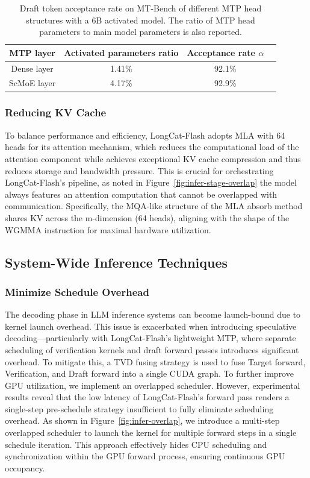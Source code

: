 \documentclass{article}
\newcommand{\longcat}{LongCat-Flash\xspace}
\begin{document}
\begin{table}[ht]
\caption{Draft token acceptance rate on MT-Bench of different MTP head structures with a 6B activated model. The ratio of MTP head parameters to main model parameters is also reported.}
\centering
\begin{tabular}{cccc}
\toprule
MTP layer & Activated parameters ratio &  Acceptance rate $\alpha$ \\ 
\midrule
Dense layer  & 1.41\%  & 92.1\%   \\ 
ScMoE layer  &  4.17\%  &  92.9\%  \\ 
\bottomrule
\end{tabular}
\label{table:mtp_speedup}
\end{table}

\subsubsection{Reducing KV Cache}

To balance performance and efficiency, \longcat adopts MLA with 64 heads for its attention mechanism, which reduces the computational load of the attention component while achieves exceptional KV cache compression and thus reduces storage and bandwidth pressure. This is crucial for orchestrating \longcat's pipeline, as noted in Figure~\ref{fig:infer-stage-overlap} the model always features an attention computation that cannot be overlapped with communication. Specifically, the MQA-like structure of the MLA absorb method shares KV across the m-dimension (64 heads), aligning with the shape of the WGMMA instruction for maximal hardware utilization. 

\subsection{System-Wide Inference Techniques}

\subsubsection{Minimize Schedule Overhead}

The decoding phase in LLM inference systems can become launch-bound due to kernel launch overhead. This issue is exacerbated when introducing speculative decoding---particularly with \longcat's lightweight MTP, where separate scheduling of verification kernels and draft forward passes introduces significant overhead. To mitigate this, a TVD fusing strategy is used to fuse Target forward, Verification, and Draft forward into a single CUDA graph.
To further improve GPU utilization, we implement an overlapped scheduler. However, experimental results reveal that the low latency of \longcat's forward pass renders a single-step pre-schedule strategy insufficient to fully eliminate scheduling overhead. As shown in Figure~\ref{fig:infer-overlap}, we introduce a multi-step overlapped scheduler to launch the kernel for multiple forward steps in a single schedule iteration. This approach effectively hides CPU scheduling and synchronization within the GPU forward process, ensuring continuous GPU occupancy. 
\end{document}
